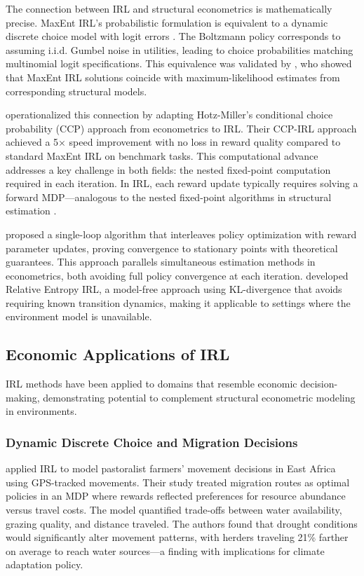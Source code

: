 The connection between IRL and structural econometrics is mathematically precise. MaxEnt IRL's probabilistic formulation is equivalent to a dynamic discrete choice model with logit errors \citep{Ermon2015}. The Boltzmann policy corresponds to assuming i.i.d. Gumbel noise in utilities, leading to choice probabilities matching multinomial logit specifications. This equivalence was validated by \citet{Ermon2015}, who showed that MaxEnt IRL solutions coincide with maximum-likelihood estimates from corresponding structural models.

\citet{Sharma2018} operationalized this connection by adapting Hotz-Miller's conditional choice probability (CCP) approach from econometrics to IRL. Their CCP-IRL approach achieved a 5× speed improvement with no loss in reward quality compared to standard MaxEnt IRL on benchmark tasks. This computational advance addresses a key challenge in both fields: the nested fixed-point computation required in each iteration. In IRL, each reward update typically requires solving a forward MDP—analogous to the nested fixed-point algorithms in structural estimation \citep{Rust1987}.

\citet{Zeng2022} proposed a single-loop algorithm that interleaves policy optimization with reward parameter updates, proving convergence to stationary points with theoretical guarantees. This approach parallels simultaneous estimation methods in econometrics, both avoiding full policy convergence at each iteration. \citet{Boularias2011} developed Relative Entropy IRL, a model-free approach using KL-divergence that avoids requiring known transition dynamics, making it applicable to settings where the environment model is unavailable.

\subsection{Economic Applications of IRL}

IRL methods have been applied to domains that resemble economic decision-making, demonstrating potential to complement structural econometric modeling in environments.

\subsubsection{Dynamic Discrete Choice and Migration Decisions}

\citet{Ermon2015} applied IRL to model pastoralist farmers' movement decisions in East Africa using GPS-tracked movements. Their study treated migration routes as optimal policies in an MDP where rewards reflected preferences for resource abundance versus travel costs. The model quantified trade-offs between water availability, grazing quality, and distance traveled. The authors found that drought conditions would significantly alter movement patterns, with herders traveling 21\% farther on average to reach water sources—a finding with implications for climate adaptation policy.

